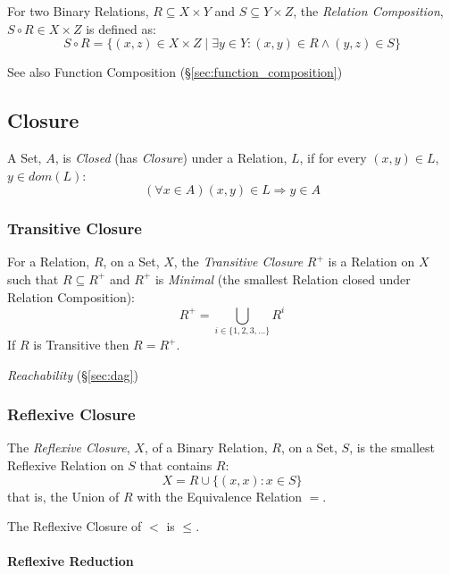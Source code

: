 For two Binary Relations, $R \subseteq X \times Y$ and $S \subseteq Y
\times Z$, the \emph{Relation Composition}, $S \circ R \in X \times Z$
is defined as:
\[
  S \circ R = \{(x,z) \in X \times Z \;|\;
  \exists y \in Y : (x,y) \in R \wedge (y,z) \in S \}
\]

See also Function Composition (\S\ref{sec:function_composition})



\subsection{Closure}\label{sec:set_closure}

A Set, $A$, is \emph{Closed} (has \emph{Closure}) under a Relation,
$L$, if for every $(x,y) \in L$, $y \in dom(L)$:
\[
  (\forall x \in A) (x,y) \in L \Rightarrow y \in A
\]



\subsubsection{Transitive Closure}\label{sec:transitive_closure}

For a Relation, $R$, on a Set, $X$, the \emph{Transitive Closure}
$R^+$ is a Relation on $X$ such that $R \subseteq R^+$ and $R^+$ is
\emph{Minimal} (the smallest Relation closed under Relation
Composition):
\[
  R^+ = \bigcup_{i \in \{1,2,3,...\}} R^i
\]
If $R$ is Transitive then $R = R^+$.

\emph{Reachability} (\S\ref{sec:dag})



\subsubsection{Reflexive Closure}\label{sec:reflexive_closure}

The \emph{Reflexive Closure}, $X$, of a Binary Relation, $R$, on a
Set, $S$, is the smallest Reflexive Relation on $S$ that contains $R$:
\[
  X = R \cup \{(x,x) : x \in S\}
\]
that is, the Union of $R$ with the Equivalence Relation $=$.

The Reflexive Closure of $<$ is $\leq$.



\paragraph{Reflexive Reduction}\label{sec:reflexive_reduction}
\hfill \\

